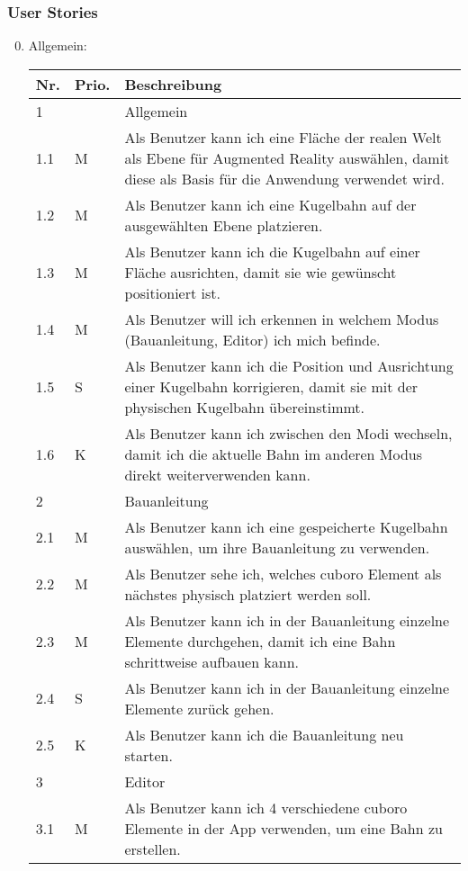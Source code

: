 \subsubsection{User Stories}
\begin{enumerate}
	\setcounter{enumi}{-1}	%
	\item Allgemein:
	\begin{longtable}{l l p{12cm}}
		\hline
		\textbf{Nr.} & \textbf{Prio.} & \textbf{Beschreibung} \\
		\hline
		1 & & Allgemein \\
		\hline
		1.1 & M & Als Benutzer kann ich eine Fläche der realen Welt als Ebene für Augmented Reality auswählen, damit diese als Basis für die Anwendung verwendet wird. \\
		1.2 & M & Als Benutzer kann ich eine Kugelbahn auf der ausgewählten Ebene platzieren. \\
		1.3 & M & Als Benutzer kann ich die Kugelbahn auf einer Fläche ausrichten, damit sie wie gewünscht positioniert ist. \\
		1.4 & M & Als Benutzer will ich erkennen in welchem Modus (Bauanleitung, Editor) ich mich befinde. \\
		1.5 & S & Als Benutzer kann ich die Position und Ausrichtung einer Kugelbahn korrigieren, damit sie mit der physischen Kugelbahn übereinstimmt. \\
		1.6 & K & Als Benutzer kann ich zwischen den Modi wechseln, damit ich die aktuelle Bahn im anderen Modus direkt weiterverwenden kann. \\
		\hline
		2 & & Bauanleitung \\
		\hline
		2.1 & M & Als Benutzer kann ich eine gespeicherte Kugelbahn auswählen, um ihre Bauanleitung zu verwenden. \\
		2.2 & M & Als Benutzer sehe ich, welches cuboro Element als nächstes physisch platziert werden soll. \\
		2.3 & M & Als Benutzer kann ich in der Bauanleitung einzelne Elemente durchgehen, damit ich eine Bahn schrittweise aufbauen kann. \\
		2.4 & S & Als Benutzer kann ich in der Bauanleitung einzelne Elemente zurück gehen. \\
		2.5 & K & Als Benutzer kann ich die Bauanleitung neu starten. \\
		\hline
		3 & & Editor \\
		\hline
		3.1 & M & Als Benutzer kann ich 4 verschiedene cuboro Elemente in der App verwenden, um eine Bahn zu erstellen. \\

\end{longtable}
\end{enumerate}
